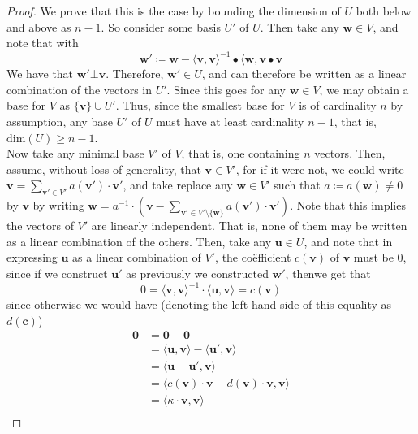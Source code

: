 	\begin{proof}
		We prove that this is the case by bounding the dimension of $U$ both below and 
		above as $n-1$. So consider some basis $U'$ of $U$. Then take any $\mathbf{w} \in 
		V$, and note that with
		$$
			\mathbf{w}' \coloneqq \mathbf{w} - 
			\langle\mathbf{v},\mathbf{v}\rangle^{-1} \bullet 
			\langle\mathbf{w},\mathbf{v}\bullet \mathbf{v}
		$$
		We have that $\mathbf{w}' \bot \mathbf{v}$. Therefore, $\mathbf{w}' \in U$, and 
		can therefore be written as a linear combination of the vectors in $U'$. Since 
		this goes for any $\mathbf{w} \in V$, we may obtain a base for $V$ as $\{
		\mathbf{v}\} \cup U'$. Thus, since the smallest base for $V$ is of cardinality $n$ 
		by assumption, any base $U'$ of $U$ must have at least cardinality $n-1$, that is, 
		$\mathrm{dim} (U) \geq n-1$. \\
		Now take any minimal base $V'$ of $V$, that is, one containing $n$ vectors. Then,
		assume, without loss of generality, that $\mathbf{v} \in V'$, for if it were not, 
		we could write $\mathbf{v} = \sum_{\mathbf{v'} \in V'} a(\mathbf{v}') \cdot 
		\mathbf{v}'$, and take replace any $\mathbf{w} \in V'$ such that $a \coloneqq 
		a(\mathbf{w}) \neq 0$ by $\mathbf{v}$ by writing  $\mathbf{w} = a^{-1} \cdot 
		\left(\mathbf{v}- \sum_{\mathbf{v}' \in V'\setminus{\{\mathbf{w}\}}}a(\mathbf{v}') 
		\cdot\mathbf{v}'\right)$. Note that this implies the vectors of $V'$ are linearly 
		independent. That is, none of them may be written as a linear combination of the 
		others. Then, take any $\mathbf{u}\in U$, and note that in expressing $\mathbf{u}$ 
		as a linear combination of $V'$, the co\"efficient $c(\mathbf{v})$ of $\mathbf{v}$ 
		must be $0$, 
		since if we construct $\mathbf{u}'$ as previously we constructed $\mathbf{w}'$, 
		thenwe get that 
		$$
			0 = \langle\mathbf{v},\mathbf{v}\rangle^{-1} \cdot
			\langle\mathbf{u},\mathbf{v}\rangle = c(\mathbf{v})
		$$
		since otherwise we would have (denoting the left hand side of this equality as
		$d(\mathbf{c})$) 
		\begin{align*}
			\mathbf{0} &= \mathbf{0} - \mathbf{0} \\
			           &= \langle\mathbf{u},\mathbf{v}\rangle - 
				   \langle\mathbf{u}',\mathbf{v}\rangle \\
				   &= \langle\mathbf{u}-\mathbf{u}',\mathbf{v}\rangle \\
			&=\langle c(\mathbf{v})\cdot\mathbf{v}-d(\mathbf{v})\cdot\mathbf{v},
			\mathbf{v}\rangle \\
			           &= \langle \kappa \cdot \mathbf{v}, \mathbf{v}\rangle \\

\end{align*}
\end{proof}
